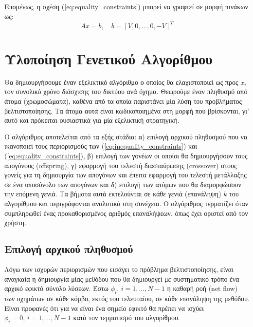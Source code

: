 \documentclass[a4paper,12pt]{article}
\begin{document}
Επομένως, η σχέση (\ref{eq:equality_constraints}) μπορεί να γραφτεί σε μορφή πινάκων ως:
\begin{equation}
    A x = b, \quad b = [V,0,...,0,-V]^T
    \label{eq:equality_constraints_matrix_form}
\end{equation}

\newpage

\section{Υλοποίηση Γενετικού Αλγορίθμου}

Θα δημιουργήσουμε έναν εξελικτικό αλγόριθμο ο οποίος θα ελαχιστοποιεί ως προς $x_i$ τον συνολικό χρόνο διάσχισης 
του δικτύου ανά όχημα. Θεωρούμε έναν πληθυσμό από άτομα (χρωμοσώματα), καθένα από τα οποία παριστάνει μία λύση του
προβλήματος βελτιστοποίησης. Τα άτομα αυτά είναι κωδικοποιημένα στη μορφή που βρίσκονται, γι' αυτό και πρόκειται 
ουσιαστικά για μία εξελικτική στρατηγική. 

Ο αλγόριθμος αποτελείται από τα εξής στάδια: 
α) επιλογή αρχικού πληθυσμού που να ικανοποιεί τους περιορισμούς των (\ref{eq:inequality_constraints}) και 
(\ref{eq:equality_constraints}),
β) επιλογή των γονέων οι οποίοι θα δημιουργήσουν τους απογόνους
(offspring),
γ) εφαρμογή του τελεστή διασταύρωσης (crossover) στους γονείς 
για τη δημιουργία των απογόνων και έπειτα εφαρμογή του τελεστή μετάλλαξης σε ένα υποσύνολο των απογόνων και
δ) επιλογή των ατόμων που θα διαμορφώσουν την επόμενη γενιά. 
Τα βήματα αυτά εκτελούνται σε κάθε γενιά (επανάληψη) $k$ του αλγορίθμου και περιγράφονται αναλυτικά στη συνέχεια.
Ο αλγόριθμος τερματίζει όταν συμπληρωθεί ένας προκαθορισμένος αριθμός επαναλήψεων, όπως έχει οριστεί από τον χρήστη.

\subsection{Επιλογή αρχικού πληθυσμού}
Λόγω των ισχυρών περιορισμών που εισάγει το πρόβλημα βελτιστοποίησης, είναι αναγκαία η δημιουργία μίας μεθόδου
που θα δημιουργεί με συστηματικό τρόπο ένα αρχικό εφικτό σύνολο λύσεων. Έστω $\phi_i, \, i=1,...,N-1$ η καθαρή ροή 
(net flow) των οχημάτων σε κάθε κόμβο, εκτός του τελευταίου, 
σε κάθε επανάληψη της μεθόδου. Είναι προφανές ότι για να είναι ένα σημείο εφικτό θα πρέπει να ισχύει 
$\phi_i = 0, \, i=1,...,N-1$ κατά τον τερματισμό του αλγορίθμου.
\end{document}
